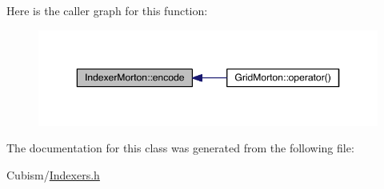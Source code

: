 Here is the caller graph for this function\+:\nopagebreak
\begin{figure}[H]
\begin{center}
\leavevmode
\includegraphics[width=350pt]{d8/d3e/class_indexer_morton_a73829c18adb4276a5c99d3de1a0249d8_icgraph}
\end{center}
\end{figure}




The documentation for this class was generated from the following file\+:\begin{DoxyCompactItemize}
\item 
Cubism/\hyperlink{_indexers_8h}{Indexers.\+h}\end{DoxyCompactItemize}
